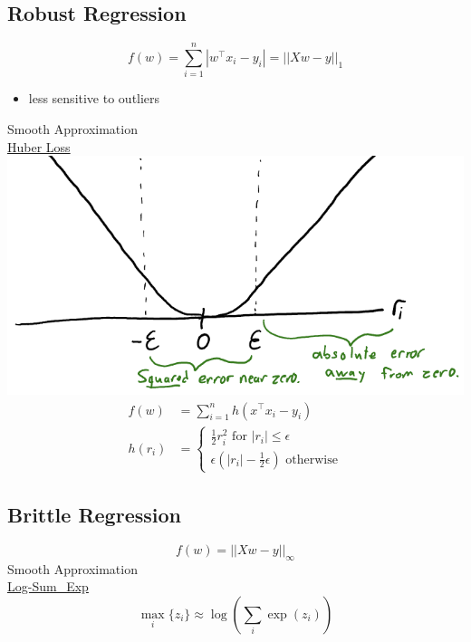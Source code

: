 \documentclass[10pt,landscape,a4paper]{article}
\begin{document}
\begin{multicols*}{5}
\subsection{Robust Regression}
\begin{dmath*}
    f(w) = \sum_{i=1}^{n} |w^\intercal x_i - y_i| = ||Xw - y||_1
\end{dmath*}
\begin{itemize}
    \item less sensitive to outliers
\end{itemize}
Smooth Approximation \\
\underline{Huber Loss} \\
\includegraphics[scale=0.2]{huber_loss}
\begin{align*}
    f(w) &= \sum_{i=1}^{n} h(x^\intercal x_i - y_i) \\
    h(r_i) &=
    \begin{cases}
        \frac{1}{2}r_i^2 \text{ for \(|r_i| \leq \epsilon \)}\\
        \epsilon (|r_i|-\frac{1}{2} \epsilon) \text{ otherwise}
    \end{cases}
\end{align*}

\subsection{Brittle Regression}
\begin{dmath*}
    f(w) = ||Xw - y||_{\infty}
\end{dmath*}
Smooth Approximation \\
\underline{Log-Sum_Exp}
\begin{dmath*}
    \max_i \{z_i\} \approx \log(\sum_i \exp(z_i))
\end{dmath*}


\end{multicols*}
\end{document}
